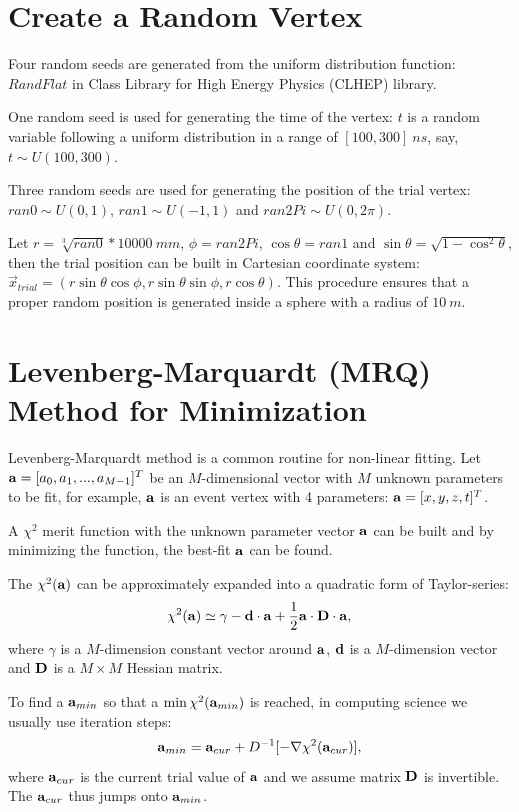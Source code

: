 \section{Create a Random Vertex}

Four random seeds are generated from the uniform distribution function: $RandFlat$ in Class Library for High Energy Physics (CLHEP) library.

One random seed is used for generating the time of the vertex: $t$ is a random variable following a uniform distribution in a range of $[100, 300]~ns$, say, $t\sim U(100,300)$.

Three random seeds are used for generating the position of the trial vertex: $ran0\sim U(0,1)$, $ran1\sim U(-1,1)$ and $ran2Pi\sim U(0,2\pi)$. 

Let $r=\sqrt[3]{ran0}*10000~mm$, $\phi=ran2Pi$, $\cos\theta=ran1$ and $\sin\theta=\sqrt{1-{\cos^2\theta}}$, then the trial position can be built in Cartesian coordinate system: $\vec{x}_{trial}=(r\sin\theta\cos\phi, r\sin\theta\sin\phi, r\cos\theta)$. This procedure ensures that a proper random position is generated inside a sphere with a radius of $10~m$.

\section{Levenberg-Marquardt (MRQ) Method for Minimization\cite{press2007numerical}}

Levenberg-Marquardt method is a common routine for non-linear fitting. Let ${\bf a} = [a_0, a_1, ..., a_{M-1}]^T$ be an $M$-dimensional vector with $M$ unknown parameters to be fit, 
for example, $\bf a$ is an event vertex with 4 parameters: ${\bf a}=[x,y,z,t]^T$.

A $\chi^2$ merit function with the unknown parameter vector $\bf a$ can be built and by minimizing the function, the best-fit $\bf a$ can be found.

The $\chi^2(\bf a)$ can be approximately expanded into a quadratic form of Taylor-series:
\begin{equation} \label{eq:1}
\chi^2({\bf a})\simeq \gamma-{\bf d\cdot a}+\frac{1}{2}{\bf a\cdot D\cdot a},
\end{equation}
where $\gamma$ is a $M$-dimension constant vector around $\bf a$, $\bf d$ is a $M$-dimension vector and $\bf D$ is a $M\times M$ Hessian matrix.

To find a ${\bf a}_{min}$ so that a $\min\chi^2({\bf a}_{min})$ is reached, in computing science we usually use iteration steps: 
\begin{equation} \label{eq:2}{\bf a}_{min}={\bf a}_{cur}+D^{-1}[-\nabla\chi^2({\bf a}_{cur})],\end{equation} 
where ${\bf a}_{cur}$ is the current trial value of $\bf a$ and we assume matrix $\bf D$ is invertible. The ${\bf a}_{cur}$ thus jumps onto ${\bf a}_{min}$. 

